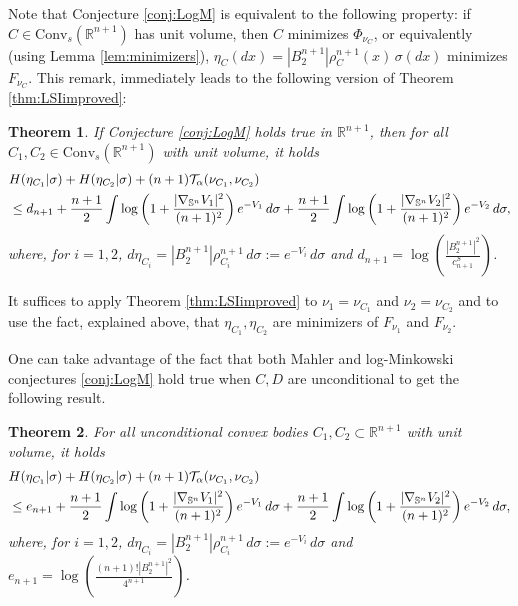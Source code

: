 \documentclass[10pt]{amsart}
\newtheorem{thm}{Theorem}[section]
\theoremstyle{definition}
\theoremstyle{remark}
\newcommand{\R}{\mathbb{R}}
\newcommand{\Sd}{\mathbb{S}}
\begin{document}
Note that Conjecture \ref{conj:LogM} is equivalent to the following property: if $C \in \mathrm{Conv}_s(\R^{n+1})$ has unit volume, then $C$ minimizes $\Phi_{\nu_C}$, or equivalently (using Lemma \ref{lem:minimizers}), $\eta_C(dx) = |B_2^{n+1}|\rho_C^{n+1}(x)\,\sigma(dx)$ minimizes $F_{\nu_C}$. This remark, immediately leads to the following version of Theorem \ref{thm:LSIimproved}:

\begin{thm}\label{thm:LSIimproved2}
 If Conjecture \ref{conj:LogM} holds true in $\R^{n+1}$, then for all $C_1,C_2 \in \mathrm{Conv}_s(\R^{n+1})$ with unit volume, it holds 
\begin{align}\label{eq:LSIimproved2}
\notag &H(\eta_{C_1} | \sigma)+ H(\eta_{C_2} | \sigma) + (n+1)\mathcal{T}_\alpha(\nu_{C_1},\nu_{C_2})\\
&\leq d_{n+1} + \frac{n+1}{2}\int \log\left(1+ \frac{|\nabla_{\Sd^n}V_1|^2}{(n+1)^2} \right)e^{-V_{1}}\,d\sigma 
+ \frac{n+1}{2}\int \log\left(1+ \frac{|\nabla_{\Sd^n}V_2|^2}{(n+1)^2} \right)e^{-V_{2}}\,d\sigma,
\end{align}
where, for $i=1,2$, $d\eta_{C_i} = |B_2^{n+1}| \rho_{C_i}^{n+1}\,d\sigma := e^{-V_i}\,d\sigma$ and $d_{n+1} = \log \left(\frac{|B_2^{n+1}|^2}{c_{n+1}^S}\right)$.

\end{thm}

\proof
It suffices to apply Theorem \ref{thm:LSIimproved} to $\nu_1 = \nu_{C_1}$ and $\nu_2=\nu_{C_2}$ and to use the fact, explained above, that $\eta_{C_1},\eta_{C_2}$ are minimizers of $F_{\nu_1}$ and $F_{\nu_2}$. 
\endproof

One can take advantage of the fact that both Mahler and log-Minkowski conjectures \eqref{conj:LogM} hold true when $C,D$ are unconditional to get the following result.

\begin{thm}\label{thm:LSIimproved-unconditional}
For all unconditional convex bodies $C_1,C_2 \subset \R^{n+1}$ with unit volume, it holds 
 \begin{align}\label{eq:LSIimproved-unconditional}
 &H(\eta_{C_1} | \sigma)+ H(\eta_{C_2} | \sigma) + (n+1)\mathcal{T}_\alpha(\nu_{C_1},\nu_{C_2})\\
\notag&\leq e_{n+1} + \frac{n+1}{2}\int \log\left(1+ \frac{|\nabla_{\Sd^n}V_1|^2}{(n+1)^2} \right)e^{-V_{1}}\,d\sigma 
+ \frac{n+1}{2}\int \log\left(1+ \frac{|\nabla_{\Sd^n}V_2|^2}{(n+1)^2} \right)e^{-V_{2}}\,d\sigma,
\end{align}
where, for $i=1,2$, $d\eta_{C_i} = |B_2^{n+1}| \rho_{C_i}^{n+1}\,d\sigma := e^{-V_i}\,d\sigma$ and $e_{n+1}= \log \left(\frac{(n+1)!|B_2^{n+1}|^2}{4^{n+1}}\right)$.
\end{thm}
\end{document}
